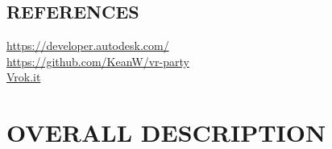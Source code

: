 \documentclass[letterpaper, 10pt, draftclsnofoot, compsoc, onecolumn]{IEEEtran}
\begin{document}
\subsection[REFERENCES]{\rmfamily\bfseries\color{black}
REFERENCES}
{\color{black}

\url{https://developer.autodesk.com/}\\

\url{https://github.com/KeanW/vr-party}\\

\url{Vrok.it}\\
}

\clearpage\section[OVERALL
DESCRIPTION]{\rmfamily\bfseries\color{black}
OVERALL DESCRIPTION}
\end{document}
